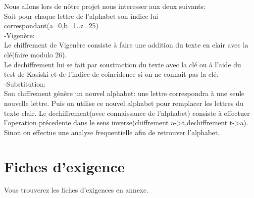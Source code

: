 \documentclass[a4]{article}
\begin{document}
				Nous allons lors de nôtre projet nous interesser aux deux suivants:\\
			Soit pour chaque lettre de l'alphabet son indice lui correspondant(a=0,b=1..z=25)\\
			-Vigenère:\\
			Le chiffrement de Vigenère consiste à faire une addition du texte en clair avec la clé(faire modulo 26).\\
			Le dechiffrement lui se fait par soustraction du texte avec la clé ou à l'aide du test de Kasiski et de l'indice de coincidence si on ne connait pas la clé.\\
				-Substitution:\\
				Son chiffrement génère un nouvel alphabet: une lettre correspondra à une seule nouvelle lettre. Puis on utilise ce nouvel alphabet pour remplacer les lettres du texte clair.
				Le dechiffrement(avec connaissance de l'alphabet) consiste à effectuer l'operation précedente dans le sens inverse(chiffrement a->t,dechiffrement t->a). Sinon on effectue une analyse frequentielle afin de retrouver l'alphabet.\\
				
				
		\section{Fiches d'exigence}
				Vous trouverez les fiches d'exigences en annexe.
\end{document}
